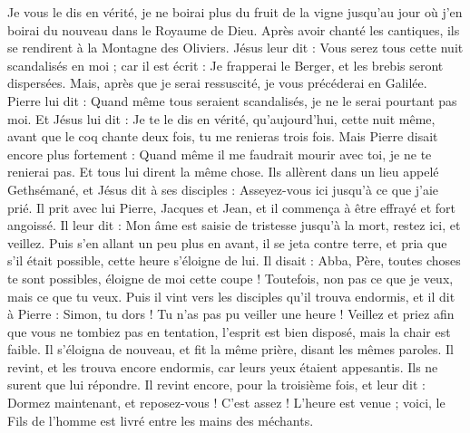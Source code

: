 \begin{multicols}{2}
Je vous le dis en vérité, je ne boirai plus du fruit de la vigne jusqu'au jour où j’en boirai du nouveau dans le Royaume de Dieu.
Après avoir chanté les cantiques{}, ils se rendirent à la Montagne des Oliviers.
Jésus leur dit : Vous serez tous cette nuit scandalisés en moi ; car il est écrit : Je frapperai le Berger, et les brebis seront dispersées{}.
Mais, après que je serai ressuscité, je vous précéderai en Galilée.
Pierre lui dit : Quand même tous seraient scandalisés, je ne le serai pourtant pas moi.
Et Jésus lui dit : Je te le dis en vérité, qu'aujourd'hui, cette nuit même, avant que le coq chante deux fois, tu me renieras trois fois.
Mais Pierre disait encore plus fortement : Quand même il me faudrait mourir avec toi, je ne te renierai pas. Et tous lui dirent la même chose.
Ils allèrent dans un lieu appelé Gethsémané, et Jésus dit à ses disciples : Asseyez-vous ici jusqu'à ce que j’aie prié.
Il prit avec lui Pierre, Jacques et Jean, et il commença à être effrayé et fort angoissé.
Il leur dit : Mon âme est saisie de tristesse jusqu’à la mort, restez ici, et veillez.
Puis s'en allant un peu plus en avant, il se jeta contre terre, et pria que s'il était possible, cette heure s’éloigne de lui.
Il disait : Abba, Père, toutes choses te sont possibles, éloigne de moi cette coupe ! Toutefois, non pas ce que je veux, mais ce que tu veux.
Puis il vint vers les disciples qu’il trouva endormis, et il dit à Pierre : Simon, tu dors ! Tu n’as pas pu veiller une heure !
Veillez et priez afin que vous ne tombiez pas en tentation, l'esprit est bien disposé, mais la chair est faible.
Il s’éloigna de nouveau, et fit la même prière, disant les mêmes paroles.
Il revint, et les trouva encore endormis, car leurs yeux étaient appesantis. Ils ne surent que lui répondre.
Il revint encore, pour la troisième fois, et leur dit : Dormez maintenant, et reposez-vous ! C’est assez ! L’heure est venue ; voici, le Fils de l'homme est livré entre les mains des méchants.

\end{multicols}
